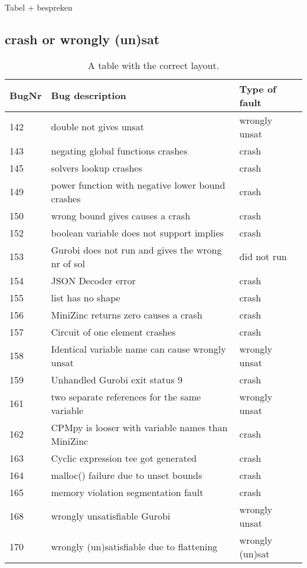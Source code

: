 Tabel + bespreken
\subsection{crash or wrongly (un)sat}
\begin{table}[]
	\centering
	\begin{tabular}{lll}
		BugNr & Bug description                                           & Type of fault   \\ \toprule
		142   & double not gives unsat                                    & wrongly unsat   \\
		143   & negating global functions crashes                         & crash           \\
		145   & solvers lookup crashes                                    & crash           \\
		149   & power function with negative lower bound crashes          & crash           \\
		150   & wrong bound gives causes a crash                          & crash           \\
		152   & boolean variable does not support implies                 & crash           \\
		153   & Gurobi does not run and gives the wrong nr of sol         & did not run     \\
		154   & JSON Decoder error                                        & crash           \\
		155   & list has no shape                                         & crash           \\
		156   & MiniZinc returns zero causes a crash                      & crash           \\
		157   & Circuit of one element crashes                            & crash           \\
		158   & Identical variable name can cause wrongly unsat           & wrongly unsat   \\
		159   & Unhandled Gurobi exit status 9                            & crash           \\
		161   & two separate references for the same variable             & wrongly unsat   \\
		162   & CPMpy is looser with variable names than MiniZinc         & crash           \\
		163   & Cyclic expression tee got generated                       & crash           \\
		164   & malloc() failure due to unset bounds                      & crash           \\
		165   & memory violation segmentation fault                       & crash           \\
		168   & wrongly unsatisfiable Gurobi                              & wrongly unsat   \\
		170   & wrongly (un)satisfiable due to flattening                 & wrongly (un)sat \\ \bottomrule
	\end{tabular}
	\caption{A table with the correct layout.}
	\label{tab:bug:fault}
\end{table}

